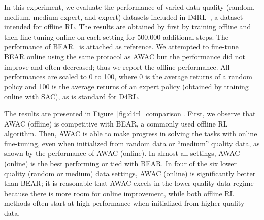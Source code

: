 In this experiment, we evaluate the performance of varied data quality (random, medium, medium-expert, and expert) datasets included in D4RL~\citep{fu2020d4rl}, a dataset intended for offline RL. The results are obtained by first by training offline and then fine-tuning online on each setting for 500,000 additional steps. The performance of BEAR~\citep{kumar19bear} is attached as reference. We attempted to fine-tune BEAR online using the same protocol as AWAC but the performance did not improve and often decreased; thus we report the offline performance. All performances are scaled to 0 to 100, where 0 is the average returns of a random policy and 100 is the average returns of an expert policy (obtained by training online with SAC), as is standard for D4RL.

The results are presented in Figure~\ref{fig:d4rl_comparison}. First, we observe that AWAC (offline) is competitive with BEAR, a commonly used offline RL algorithm. Then, AWAC is able to make progress in solving the tasks with online fine-tuning, even when initialized from random data or “medium” quality data, as shown by the performance of AWAC (online). In almost all settings, AWAC (online) is the best performing or tied with BEAR. In four of the six lower quality (random or medium) data settings, AWAC (online) is significantly better than BEAR; it is reasonable that AWAC excels in the lower-quality data regime because there is more room for online improvement, while both offline RL methods often start at high performance when initialized from higher-quality data.

